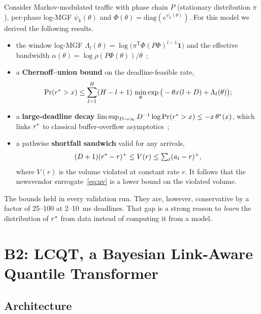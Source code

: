 Consider Markov-modulated traffic with phase chain $P$ (stationary distribution $\pi$), per-phase log-MGF $\psi_k(\theta)$ and $\Phi(\theta) = \mathrm{diag}(e^{\psi_k(\theta)})$. For this model we derived the following results.
\begin{itemize}
  \item the window log-MGF $\Lambda_l(\theta) = \log\big(\pi^{\mathsf T}\Phi(P\Phi)^{l-1}\mathbf 1\big)$ and the effective bandwidth $\alpha(\theta) = \log\rho(P\Phi(\theta))/\theta$~\cite{kesidis1993,kelly1996};
  \item a \textbf{Chernoff--union bound} on the deadline-feasible rate,
  \begin{equation}
    \Pr(r^{\ast} > x) \le \sum_{l=1}^{H}(H-l+1)\,\min_\theta \exp\big(-\theta x(l+D) + \Lambda_l(\theta)\big);
  \end{equation}
  \item a \textbf{large-deadline decay} $\limsup_{D\to\infty} D^{-1}\log\Pr(r^{\ast} > x) \le -x\,\theta^\ast(x)$, which links $r^{\ast}$ to classical buffer-overflow asymptotics~\cite{anick1982,duffield1994};
  \item a pathwise \textbf{shortfall sandwich} valid for any arrivals,
  \begin{equation}
    (D+1)(r^{\ast} - r)^+ \le V(r) \le \textstyle\sum_t (a_t - r)^+,
  \end{equation}
  where $V(r)$ is the volume violated at constant rate $r$. It follows that the newsvendor surrogate~\eqref{eq:nv} is a lower bound on the violated volume.
\end{itemize}
The bounds held in every validation run. They are, however, conservative by a factor of 25--100 at 2--10~ms deadlines. That gap is a strong reason to \emph{learn} the distribution of $r^{\ast}$ from data instead of computing it from a model.

\section{B2: LCQT, a Bayesian Link-Aware Quantile Transformer}
\label{sec:lcqt}

\subsection{Architecture}

